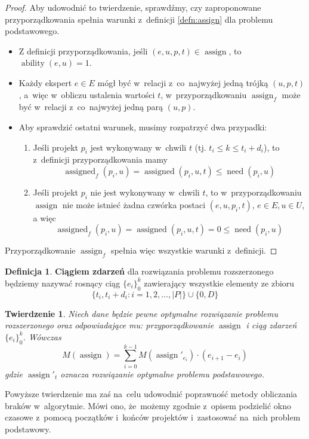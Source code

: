 \documentclass[12pt,a4paper]{article}
\newtheorem{thm}{Twierdzenie}
\theoremstyle{definition}
\newtheorem{defn}{Definicja}
\DeclareMathOperator{\ability}{ability}
\DeclareMathOperator{\need}{need}
\DeclareMathOperator{\assign}{assign}
\DeclareMathOperator{\assigned}{assigned}
\begin{document}
\begin{proof}
Aby udowodnić to twierdzenie, sprawdźmy, czy zaproponowane przyporządkowania spełnia warunki z~definicji \ref{defn:assign} dla problemu podstawowego.
\begin{itemize}
	\item Z definicji przyporządkowania, jeśli $(e, u, p, t) \in \assign$, to $\ability(e, u) = 1$.
	\item Każdy ekspert $e \in E$ mógł być w~relacji z~co~najwyżej jedną trójką $(u, p, t)$, a~więc w~obliczu ustalenia wartości $t$, w~przyporządkowaniu $\assign_f$ może być w~relacji z~co~najwyżej jedną parą $(u, p)$.
	\item Aby sprawdzić ostatni warunek, musimy rozpatrzyć dwa przypadki:
	\begin{enumerate}
		\item Jeśli projekt $p_i$ jest wykonywany w~chwili $t$ (tj. $t_i \leq k \leq t_i + d_i$), to z~definicji przyporządkowania mamy
		$$ \assigned_f(p_i, u) = \assigned(p_i, u, t) \leq \need(p_i, u) $$
		\item Jeśli projekt $p_i$ nie jest wykonywany w~chwili $t$, to w~przyporządkowaniu $\assign$ nie może istnieć żadna czwórka postaci $(e, u, p_i, t)$, $e \in E, u \in U$, a więc
		$$ \assigned_f(p_i, u) = \assigned(p_i, u, t) = 0 \leq \need(p_i, u) $$
	\end{enumerate}
\end{itemize}
Przyporządkowanie $\assign_f$ spełnia więc wszystkie warunki z~definicji.
\end{proof}

\begin{defn}
\textbf{Ciągiem zdarzeń} dla rozwiązania problemu rozszerzonego będziemy nazywać rosnący ciąg $\{e_i\}_0^k$ zawierający wszystkie elementy ze zbioru
$$ \{ t_i, t_i + d_i : i = 1, 2, \dots, |P| \} \cup \{ 0, D \} $$
\end{defn}

\begin{thm}
Niech dane będzie pewne optymalne rozwiązanie problemu rozszerzonego oraz odpowiadające mu: przyporządkowanie $\assign$ i ciąg zdarzeń $\{e_i\}_0^k$.
Wówczas
$$ M(\assign) = \sum_{i=0}^{k-1} M(\assign'_{e_i}) \cdot (e_{i+1} - e_i) $$
gdzie $\assign'_t$ oznacza rozwiązanie optymalne problemu podstawowego.
\end{thm}

\noindent
Powyższe twierdzenie ma zaś na~celu udowodnić poprawność metody obliczania braków w~algorytmie.
Mówi ono, że~możemy zgodnie z~opisem podzielić okno czasowe z~pomocą początków i~końców projektów i~zastosować na~nich problem podstawowy.
\end{document}
